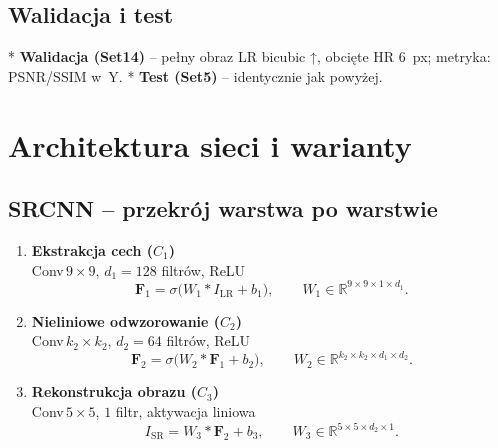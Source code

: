\documentclass[11pt]{article}
\begin{document}
\subsection{Walidacja i test}

* \textbf{Walidacja (Set14)} – pełny obraz LR bicubic ↑, obcięte HR
\(6\)~px; metryka: PSNR/SSIM w~Y.
* \textbf{Test (Set5)} – identycznie jak powyżej.



\section{Architektura sieci i warianty}
\label{sec:model}

\subsection{SRCNN – przekrój warstwa po warstwie}

\begin{enumerate}
  \item \textbf{Ekstrakcja cech (\(C_1\))}\\
        Conv$\,9\times9$, $d_1=128$ filtrów,\; ReLU  
        \[
          \mathbf F_1 = \sigma\!\bigl(W_1 * I_\mathrm{LR}+b_1\bigr),
        \qquad
          W_1\in\mathbb R^{9\times 9\times 1\times d_1}.
        \]
  \item \textbf{Nieliniowe odwzorowanie (\(C_2\))}\\
        Conv$\,k_2\times k_2$, $d_2=64$ filtrów,\; ReLU
        \[
          \mathbf F_2 = \sigma\!\bigl(W_2 * \mathbf F_1 + b_2\bigr),
          \qquad
          W_2\in\mathbb R^{k_2\times k_2\times d_1\times d_2}.
        \]
  \item \textbf{Rekonstrukcja obrazu (\(C_3\))}\\
        Conv$\,5\times5$, $1$ filtr, aktywacja liniowa
        \[
          I_\mathrm{SR}= W_3 * \mathbf F_2 + b_3,
          \qquad
          W_3\in\mathbb R^{5\times 5\times d_2\times 1}.
        \]
\end{enumerate}
\end{document}
